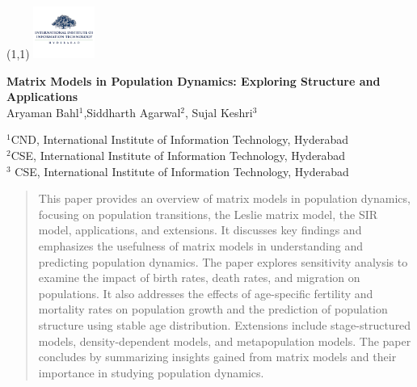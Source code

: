 \documentclass[12pt]{article}
\begin{document}
\begin{textblock}{1}(1,1)
  \includegraphics[width=2cm]{IIIT-Hyderabad-Logo.png}
  \label{fig:image}
\end{textblock}

\begin{center}
\textbf{\Large Matrix Models in Population Dynamics: Exploring Structure and Applications} \\

\vspace{1.5cc}
{ \sc Aryaman Bahl$^{1}$,Siddharth Agarwal$^{2}$, Sujal Keshri$^{3}$}\\

\vspace{0.3 cm}

{\small $^{1}$CND, International Institute of Information Technology, Hyderabad\\ $^{2}$CSE, International Institute of Information Technology, Hyderabad\\
$^{3}$ CSE, International Institute of Information Technology, Hyderabad\\}
\end{center}

\vspace{1.5cc}

\begin{abstract}
  \noindent  
This paper provides an overview of matrix models in population dynamics, focusing on population transitions, the Leslie matrix model, the SIR model, applications, and extensions. It discusses key findings and emphasizes the usefulness of matrix models in understanding and predicting population dynamics. The paper explores sensitivity analysis to examine the impact of birth rates, death rates, and migration on populations. It also addresses the effects of age-specific fertility and mortality rates on population growth and the prediction of population structure using stable age distribution. Extensions include stage-structured models, density-dependent models, and metapopulation models. The paper concludes by summarizing insights gained from matrix models and their importance in studying population dynamics.

\end{abstract}
\end{document}
